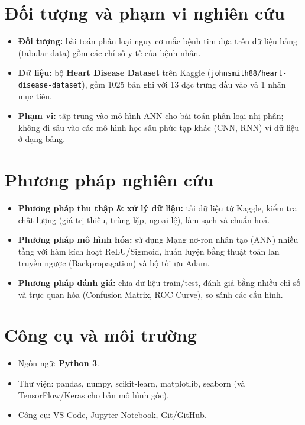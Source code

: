 \section{Đối tượng và phạm vi nghiên cứu}
\begin{itemize}
  \item \textbf{Đối tượng:} bài toán phân loại nguy cơ mắc bệnh tim dựa trên dữ
        liệu bảng (tabular data) gồm các chỉ số y tế của bệnh nhân.
  \item \textbf{Dữ liệu:} bộ \textbf{Heart Disease Dataset} trên Kaggle
        (\texttt{johnsmith88/heart-disease-dataset}), gồm 1025 bản ghi với 13 đặc
        trưng đầu vào và 1 nhãn mục tiêu.
  \item \textbf{Phạm vi:} tập trung vào mô hình ANN cho bài toán phân loại nhị
        phân; không đi sâu vào các mô hình học sâu phức tạp khác (CNN, RNN) vì dữ
        liệu ở dạng bảng.
\end{itemize}

\section{Phương pháp nghiên cứu}
\begin{itemize}
  \item \textbf{Phương pháp thu thập \& xử lý dữ liệu:} tải dữ liệu từ Kaggle,
        kiểm tra chất lượng (giá trị thiếu, trùng lặp, ngoại lệ), làm sạch và
        chuẩn hoá.
  \item \textbf{Phương pháp mô hình hóa:} sử dụng Mạng nơ-ron nhân tạo (ANN)
        nhiều tầng với hàm kích hoạt ReLU/Sigmoid, huấn luyện bằng thuật toán lan
        truyền ngược (Backpropagation) và bộ tối ưu Adam.
  \item \textbf{Phương pháp đánh giá:} chia dữ liệu train/test, đánh giá bằng
        nhiều chỉ số và trực quan hóa (Confusion Matrix, ROC Curve), so sánh các
        cấu hình.
\end{itemize}

\section{Công cụ và môi trường}
\begin{itemize}
  \item Ngôn ngữ: \textbf{Python 3}.
  \item Thư viện: pandas, numpy, scikit-learn, matplotlib, seaborn (và
        TensorFlow/Keras cho bản mô hình gốc).
  \item Công cụ: VS Code, Jupyter Notebook, Git/GitHub.
\end{itemize}

